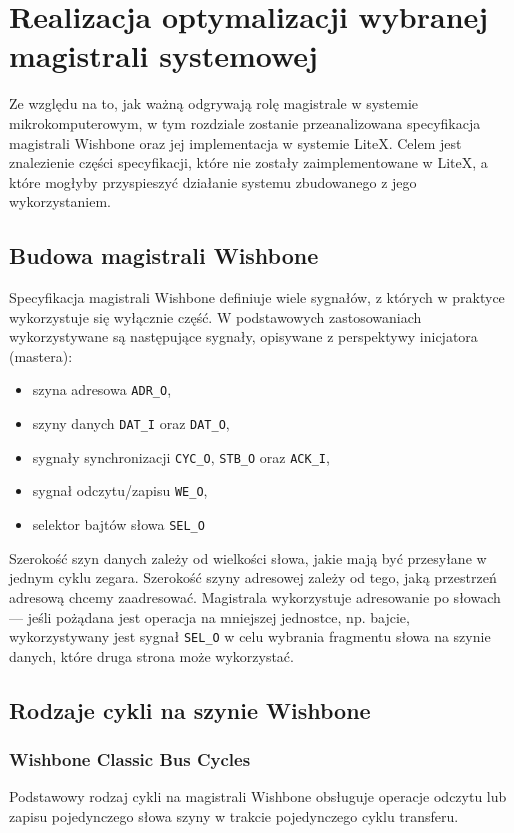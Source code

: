 \section{Realizacja optymalizacji wybranej magistrali systemowej}
Ze względu na to, jak ważną odgrywają rolę magistrale w systemie mikrokomputerowym, w tym rozdziale zostanie przeanalizowana specyfikacja magistrali Wishbone oraz jej implementacja w systemie LiteX. Celem jest znalezienie części specyfikacji, które nie zostały zaimplementowane w LiteX, a które mogłyby przyspieszyć działanie systemu zbudowanego z jego wykorzystaniem.

\subsection{Budowa magistrali Wishbone}
Specyfikacja magistrali Wishbone definiuje wiele sygnałów, z których w praktyce wykorzystuje się wyłącznie część. W podstawowych zastosowaniach wykorzystywane są następujące sygnały, opisywane z perspektywy inicjatora (mastera):
\begin{itemize}
    \item szyna adresowa \texttt{ADR_O},
    \item szyny danych \texttt{DAT_I} oraz \texttt{DAT_O},
    \item sygnały synchronizacji \texttt{CYC_O}, \texttt{STB_O} oraz \texttt{ACK_I},
    \item sygnał odczytu/zapisu \texttt{WE_O},
    \item selektor bajtów słowa \texttt{SEL_O}
\end{itemize}

Szerokość szyn danych zależy od wielkości słowa, jakie mają być przesyłane w jednym cyklu zegara. Szerokość szyny adresowej zależy od tego, jaką przestrzeń adresową chcemy zaadresować. Magistrala wykorzystuje adresowanie po słowach --- jeśli pożądana jest operacja na mniejszej jednostce, np. bajcie, wykorzystywany jest sygnał \texttt{SEL_O} w celu wybrania fragmentu słowa na szynie danych, które druga strona może wykorzystać.

\subsection{Rodzaje cykli na szynie Wishbone}

\subsubsection{Wishbone Classic Bus Cycles}
Podstawowy rodzaj cykli na magistrali Wishbone obsługuje operacje odczytu lub zapisu pojedynczego słowa szyny w trakcie pojedynczego cyklu transferu.

